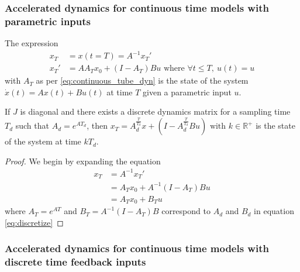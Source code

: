 \documentclass[sigconf]{llncs}
\newcommand{\mat}[1]{{#1}}
\renewcommand{\vec}[1]{{#1}}
\begin{document}
 \subsubsection{Accelerated dynamics for continuous time models with parametric inputs}\label{sec:cont_acc_param_inputs}
\begin{theorem}
The expression
 \begin{align}
 \vec{x}_T&=\vec{x}(t=T)=\mat{A}^{-1}\vec{x}_T'\nonumber\\
\vec{x}_T'&=\mat{A}\mat{A}_T\vec{x}_0 + (\mat{I}-\mat{A}_T)\mat{B}\vec{u} \text{ where } \forall t \leq T,\ \vec{u}(t)=\vec{u} 
 \end{align}
 with $\mat{A}_T$ as per \eqref{eq:continuous_tube_dyn} is the state of the system $\dot{\vec{x}}(t)=\mat{A}\vec{x}(t)+\mat{B}\vec{u}(t)$ at time $T$ given a parametric input $\vec{u}$.
 \end{theorem}
 \begin{corollary}
 If $\mat{J}$ is diagonal and there exists a discrete dynamics matrix for a sampling time $T_d$ such that $A_d=e^{\mat{A} T_d}$, then $\vec{x}_T=A_d^{\frac{T}{T_d}}\vec{x}+(\mat{I}-\mat{A}_d^{\frac{T}{T_d}}\mat{B}\vec{u}) \text{ with } k \in \mathbb{R}^+$ is the state of the system at time $kT_d$.
 \end{corollary}
 \begin{proof}
 We begin by expanding the equation
 \begin{align}
 \vec{x}_T&=\mat{A}^{-1}\vec{x}_T'\nonumber\\
 &=\mat{A}_T\vec{x}_0 + \mat{A}^{-1}(\mat{I}-\mat{A}_T)\mat{B}\vec{u}\nonumber\\
 &= \mat{A}_T\vec{x}_0 + \mat{B}_T\vec{u}
 \end{align}
 where $\mat{A}_T=e^{\mat{A}T}$ and $\mat{B}_T=\mat{A}^{-1}(\mat{I}-\mat{A}_T)\mat{B}$ correspond to $\mat{A}_d$ and $\mat{B}_d$ in equation \eqref{eq:discretize}
 \end{proof}
  
 \subsubsection{Accelerated dynamics for continuous time models with discrete time feedback inputs}\label{asec:real_discrete_feedback_inputs}
\end{document}
